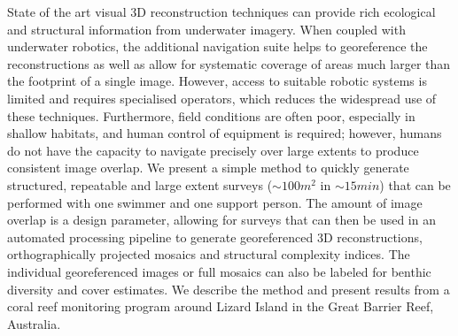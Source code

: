 
State of the art visual 3D reconstruction techniques can provide rich ecological and structural information from underwater imagery. When coupled with underwater robotics, the additional navigation suite helps to georeference the reconstructions as well as allow for systematic coverage of areas much larger than the footprint of a single image. However, access to suitable robotic systems is limited and requires specialised operators, which reduces the widespread use of these techniques. Furthermore, field conditions are often poor, especially in shallow habitats, and human control of equipment is required; however, humans do not have the capacity to navigate precisely over large extents to produce consistent image overlap.  We present a simple method to quickly generate structured, repeatable and large extent surveys ($\sim{100m^{2}}$ in $\sim{15 min}$) that can be performed with one swimmer and one support person. The amount of image overlap is a design parameter, allowing for surveys that can then be used in an automated processing pipeline to generate georeferenced 3D reconstructions, orthographically projected mosaics and structural complexity indices. The individual georeferenced images or full mosaics can also be labeled for benthic diversity and cover estimates. We describe the method and present results from a coral reef monitoring program around Lizard Island in the Great Barrier Reef, Australia.
  
  